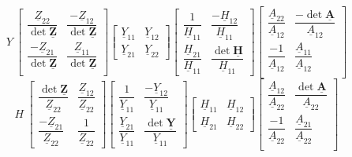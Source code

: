 \[
    Y\
    \begin{bmatrix}
        \dfrac{\underline{Z}_{22}}{\operatorname{det}\underline{\boldsymbol{Z}}} & \dfrac{-\underline{Z}_{12}}{\operatorname{det} \underline{\boldsymbol{Z}}}\\
        \dfrac{-\underline{Z}_{21}}{\operatorname{det} \underline{\boldsymbol{Z}}} & \dfrac{\underline{{Z}}_{11}}{\operatorname{det} \underline{\boldsymbol{Z}}} \\
    \end{bmatrix}
    \begin{bmatrix}
        \underline{Y}_{11} & \underline{Y}_{12}\\
        \underline{Y}_{21} & \underline{Y}_{22}
    \end{bmatrix}
    \begin{bmatrix}
        \dfrac{1}{\underline{H}_{11}} & \dfrac{-\underline{H}_{12}}{\underline{H}_{11}} \\
        \dfrac{\underline{H}_{21}}{\underline{H}_{11}} & \dfrac{\operatorname{det}\underline{\boldsymbol{{H}}}}{\underline{H}_{11}}
    \end{bmatrix}
    \begin{bmatrix}
        \dfrac{\underline{A}_{22}}{\underline{A}_{12}} & \dfrac{-\operatorname{det}\underline{\boldsymbol{A}}}{\underline{A}_{12}}\\
        \dfrac{-1}{\underline{A}_{12}} & \dfrac{\underline{{A}}_{11}}{\underline{A}_{12}} \\
    \end{bmatrix}
\]
\[
    H\
    \begin{bmatrix}
        \dfrac{\operatorname{det}\underline{\boldsymbol{{Z}}}}{\underline{Z}_{22}} & \dfrac{\underline{Z}_{12}}{\underline{Z}_{22}} \\
        \dfrac{-\underline{Z}_{21}}{\underline{Z}_{22}} & \dfrac{1}{\underline{Z}_{22}}
    \end{bmatrix}
    \begin{bmatrix}
        \dfrac{1}{\underline{Y}_{11}} & \dfrac{-\underline{Y}_{12}}{\underline{Y}_{11}} \\
        \dfrac{\underline{Y}_{21}}{\underline{Y}_{11}} & \dfrac{\operatorname{det}\underline{\boldsymbol{{Y}}}}{\underline{Y}_{11}}
    \end{bmatrix}
    \begin{bmatrix}
        \underline{H}_{11} & \underline{H}_{12}\\
        \underline{H}_{21} & \underline{H}_{22}
    \end{bmatrix}
    \begin{bmatrix}
        \dfrac{\underline{A}_{12}}{\underline{A}_{22}} & \dfrac{\operatorname{det}\underline{\boldsymbol{A}}}{\underline{A}_{22}}\\
        \dfrac{-1}{\underline{A}_{22}} & \dfrac{\underline{{A}}_{21}}{\underline{A}_{22}} \\
    \end{bmatrix}
\]
